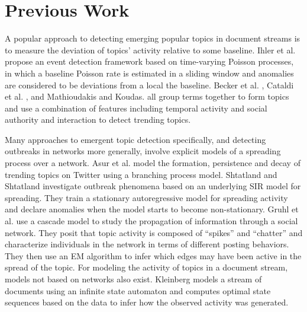 
\section{Previous Work}


A popular approach to detecting emerging popular topics in document streams is
to measure the deviation of topics' activity relative to some baseline. Ihler et
al. \cite{Ihler} propose an event detection framework based on time-varying
Poisson processes, in which a baseline Poisson rate is estimated in a sliding
window and anomalies are considered to be deviations from a local the
baseline. Becker et al. \cite{Becker}, Cataldi et al. \cite{Cataldi}, and
Mathioudakis and Koudas. \cite{Mathioudakis} all group terms together to form topics
and use a combination of features including temporal activity and social
authority and interaction to detect trending topics.

Many approaches to emergent topic detection specifically, and detecting
outbreaks in networks more generally, involve explicit models of a spreading
process over a network.  Asur et al. \cite{Asur} model the formation, persistence
and decay of trending topics on Twitter using a branching process
model. Shtatland and Shtatland \cite{Shtatland} investigate outbreak phenomena based on an
underlying SIR model for spreading. They train a stationary autoregressive model
for spreading activity and declare anomalies when the model starts to become
non-stationary. Gruhl et al. \cite{Gruhl} use a cascade model to study the propagation
of information through a social network. They posit that topic activity is
composed of ``spikes'' and ``chatter'' and characterize individuals in the
network in terms of different posting behaviors. They then use an EM algorithm
to infer which edges may have been active in the spread of the topic. For
modeling the activity of topics in a document stream, models not based on
networks also exist. Kleinberg \cite{Kleinberg} models a stream of documents using an
infinite state automaton and computes optimal state sequences based on the data
to infer how the observed activity was generated.


